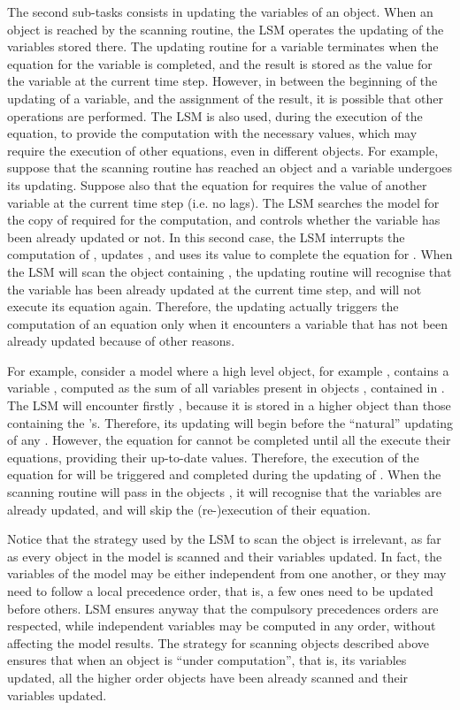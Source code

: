 \documentclass [11pt,a4paper] {book}
\begin{document}
The second sub-tasks consists in updating the variables of an object. When an object is reached by the scanning routine, the LSM operates the updating of the variables stored there. The updating routine for a variable terminates when the equation for the variable is completed, and the result is stored as the value for the variable at the current time step. However, in between the beginning of the updating of a variable, and the assignment of the result, it is possible that other operations are performed. The LSM is also used, during the execution of the equation, to provide the computation with the necessary values, which may require the execution of other equations, even in different objects. For example, suppose that the scanning routine has reached an object and a variable  undergoes its updating. Suppose also that the equation for  requires the value of another variable  at the current time step (i.e. no lags). The LSM searches the model for the copy of  required for the computation, and controls whether the variable has been already updated or not. In this second case, the LSM interrupts the computation of , updates , and uses its value to complete the equation for . When the LSM will scan the object containing , the updating routine will recognise that the  variable has been already updated at the current time step, and will not execute its equation again. Therefore, the updating actually triggers the computation of an equation only when it encounters a variable that has not been already updated because of other reasons.

For example, consider a model where a high level object, for example , contains a variable , computed as the sum of all variables  present in objects , contained in . The LSM will encounter firstly , because it is stored in a higher object than those containing the 's. Therefore, its updating will begin before the ``natural'' updating of any . However, the equation for  cannot be completed until all the  execute their equations, providing their up-to-date values. Therefore, the execution of the equation for  will be triggered and completed during the updating of . When the scanning routine will pass in the objects , it will recognise that the variables  are already updated, and will skip the (re-)execution of their equation.

Notice that the strategy used by the LSM to scan the object is irrelevant, as far as every object in the model is scanned and their variables updated. In fact, the variables of the model may be either independent from one another, or they may need to follow a local precedence order, that is, a few ones need to be updated before others. LSM ensures anyway that the compulsory precedences orders are respected, while independent variables may be computed in any order, without affecting the model results. The strategy for scanning objects described above ensures that when an object is ``under computation'', that is, its variables updated, all the higher order objects have been already scanned and their variables updated. 
\end{document}
